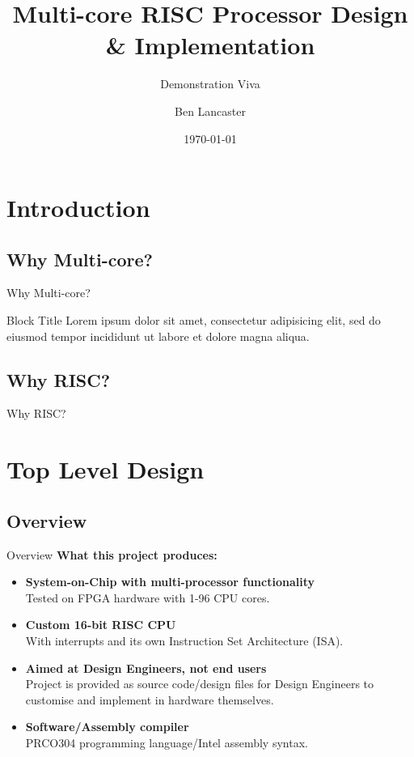 \documentclass[aspectratio=169]{beamer}
\title
    [Main Project]
    {Multi-core RISC Processor Design \& Implementation}
\subtitle{Demonstration Viva}
\author
    [B. Lancaster]
    {Ben Lancaster}
\institute
    [\hypersetup{urlcolor=jdgrey}%
     \href{https://bendl.me/}{https://bendl.me}
    ]
    {201280376\\
    ELEC5881M - Main Project}
\date
    [12/2016]
    {\today}
\begin{document}
\begin{frame}[plain]
\titlepage
\end{frame}

\begin{frame}
\tableofcontents
\end{frame}

\section{Introduction}
\frame{\tableofcontents[currentsection, subsectionstyle=show/show/hide]}

\subsection{Why Multi-core?}
\begin{frame}{Why Multi-core?}
\begin{alertblock}{Block Title}
Lorem ipsum dolor sit amet, consectetur adipisicing elit, 
sed do eiusmod tempor incididunt ut labore et 
dolore magna aliqua.
\end{alertblock}
\end{frame}

\subsection{Why RISC?}
\begin{frame}{Why RISC?}
\end{frame}

\section{Top Level Design}
\frame{\tableofcontents[currentsection, subsectionstyle=show/show/hide]}

\subsection{Overview}
\begin{frame}{Overview}
\textbf{What this project produces:}
\begin{itemize}[<+->]\setlength\itemsep{1em}
    \item{\textbf{System-on-Chip with multi-processor functionality}\\
    Tested on FPGA hardware with 1-96 CPU cores.}
    \item{\textbf{Custom 16-bit RISC CPU}\\
    With interrupts and its own Instruction Set Architecture (ISA).}
    \item{\textbf{Aimed at Design Engineers, not end users}\\
    Project is provided as source code/design files for Design Engineers to customise and implement in hardware themselves.}
    \item{\textbf{Software/Assembly compiler}\\
    PRCO304 programming language/Intel assembly syntax.}
\end{itemize}
\end{frame}
\end{document}
